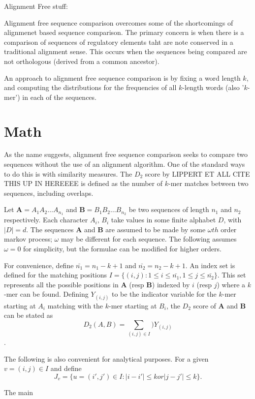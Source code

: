 Alignment Free stuff:

Alignment free sequence comparison overcomes some of the shortcomings of alignmenet based sequence comparison. The primary concern is when there is a comparison of sequences of regulatory elements taht are note conserved in a traditional alignment sense. This occurs when the sequences being compared are not orthologous (derived from a common ancestor). 

An approach to alignment free sequence comparison is by fixing a word length $k$, and computing the distributions for the frequencies of all $k$-length words (also '$k$-mer') in each of the sequences. 


\section{Math}

As the name suggests, alignment free sequence comparison seeks to compare two sequences without the use of an alignment algorithm. One of the standard ways to do this is with similarity measures. The $D_2$ score by LIPPERT ET ALL CITE THIS UP IN HEREEEE is defined as the number of $k$-mer matches between two sequences, including overlaps. 


Let $\mathbf{A} = A_1A_2\ldots A_{n_1}$ and $\mathbf{B}=B_1B_2\ldots B_{n_2}$ be two sequences of length $n_1$ and $n_2$ respectively. Each character $A_i,\,B_i$ take values in some finite alphabet $D$, with $|D| = d$.  The sequences $\mathbf{A}$ and $\mathbf{B}$ are assumed to be made by some $\omega th$ order markov process; $\omega$ may be different for each sequence. The following assumes $\omega = 0$ for simplicity, but the formulae can be modified for higher orders. 

For convenience, define $\bar{n_1} = n_1 - k + 1$ and $\bar{n_2} = n_2 - k + 1$. An index set is defined for the matching positions $I = \{(i,j): 1 \leq i \leq \bar{n_1}, 1 \leq j \leq \bar{n_2}\}$. This set represents all the possible positions in $\mathbf{A}$ (resp $\mathbf{B}$) indexed by $i$ (resp $j$) where a $k$-mer can be found. 
Defining $Y_{(i,j)}$ to be the indicator variable for the $k$-mer starting at $A_i$ matching with the $k$-mer starting at $B_i$, the $D_2$ score of $\mathbf{A}$ and $\mathbf{B}$ can be stated as 
	\begin{equation}
		D_2(A,B) = \sum_{(i,j)\in I })Y_{(i,j)}
	\end{equation}.  


The following is also convenient for analytical purposes. For a given $v = (i,j) \in I$ and define
	\begin{equation}
		J_v=\{u = (i',j') \in I : |i-i'|\leq k or |j-j'|\leq k\}.
	\end{equation} 

The main 